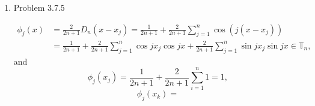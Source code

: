 \documentclass{article}%
\begin{document}
\begin{enumerate}
\item Problem 3.7.5

$$
\begin{aligned}
\phi_j(x) &= \frac{2}{2n+1}D_n(x-x_j) = \frac{1}{2n+1}+\frac{2}{2n+1}\sum_{j=1}^{n}\cos(j(x-x_j)) \\
&= \frac{1}{2n+1} + \frac{2}{2n+1}\sum_{j=1}^{n}\cos jx_j\cos jx + \frac{2}{2n+1}\sum_{j=1}^n\sin jx_j \sin jx \in \mathbb{T}_n,
\end{aligned}
$$
and
$$
\phi_j(x_j) = \frac{1}{2n+1}+\frac{2}{2n+1}\sum_{i=1}^{n}1 = 1,
$$
$$
\phi_j(x_k) = 
$$


\end{enumerate}
\end{document}

